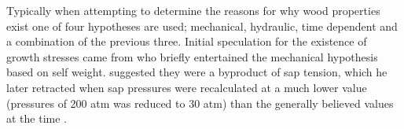 Typically when attempting to determine the reasons for why wood properties exist
one of four hypotheses are used; mechanical, hydraulic, time dependent and a
combination of the previous three. Initial speculation for the existence of
growth stresses came from \cite{MARTLEY01011928} who briefly entertained the
mechanical hypothesis based on self weight. \cite{jacobs1945l} suggested they were a
byproduct of sap tension, which he later retracted when sap
pressures were recalculated at a much lower value (pressures of 200 atm was reduced to 30 atm) than the generally believed
values at the time \cite{jacobs1965l}. 